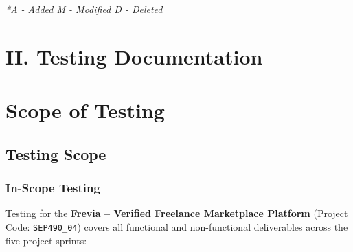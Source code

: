 \documentclass[12pt,a4paper]{article}
\begin{document}
\noindent\textit{*A - Added \quad M - Modified \quad D - Deleted}

\newpage

\section*{\fontsize{16}{19}\selectfont\bfseries\color{fptred} II. Testing Documentation}
\setcounter{section}{0}

\section{Scope of Testing}

\subsection{Testing Scope}

\subsubsection{In-Scope Testing}

Testing for the \textbf{Frevia -- Verified Freelance Marketplace Platform} (Project Code: \texttt{SEP490\_04}) covers all functional and non-functional deliverables across the five project sprints:
\end{document}
